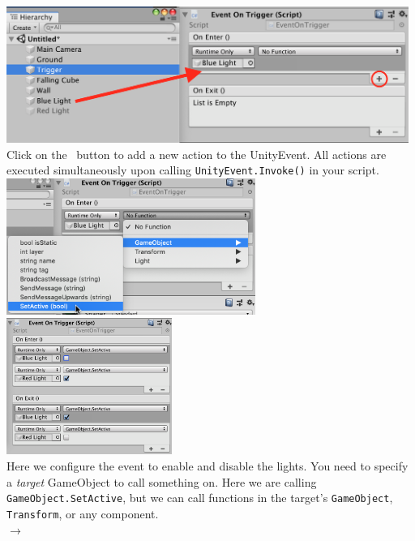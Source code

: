 \documentclass[11pt]{article}
\begin{document}
\begin{center}
\includegraphics[height=12em]{unityevent-1} \\
Click on the \faPlus\ button to add a new action to the UnityEvent.  All actions are executed 
simultaneously upon calling \lstinline|UnityEvent.Invoke()| in your script.\\
\includegraphics[height=12em]{unityevent-2} \includegraphics[height=12em]{unityevent-3} \\
Here we configure the event to enable and disable the lights.  You need to specify a \textit{target}
GameObject to call something on.  Here we are calling \lstinline{GameObject.SetActive}, but we can
call functions in the target's \lstinline|GameObject|, \lstinline|Transform|, or any component.  \\
 $\rightarrow$

\end{center}
\end{document}
